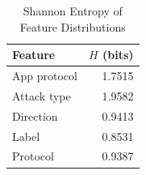 \begin{table}[htbp]
\centering
\caption{Shannon Entropy of Feature Distributions}\label{tab:entropy}
\begin{tabular}{lr}
\toprule
\textbf{Feature} & \textbf{$H$ (bits)} \\
\midrule
App protocol & 1.7515 \\
Attack type & 1.9582 \\
Direction & 0.9413 \\
Label & 0.8531 \\
Protocol & 0.9387 \\
\bottomrule
\end{tabular}
\end{table}
